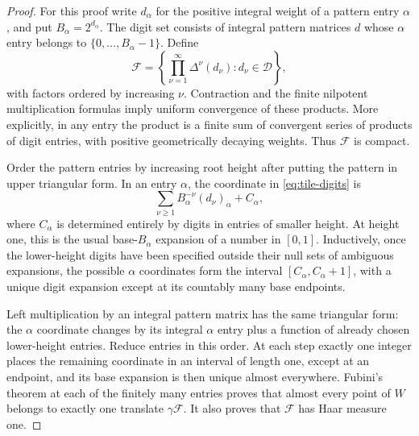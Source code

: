\begin{proof}
For this proof write \(d_\alpha\) for the positive integral weight
of a pattern entry \(\alpha\), and put \(B_\alpha=2^{d_\alpha}\).
The digit set consists of integral pattern matrices \(d\) whose
\(\alpha\) entry belongs to \(\{0,\ldots,B_\alpha-1\}\).
Define
\begin{equation}\label{eq:tile-digits}
 \mathcal F=
 \left\{
      \prod_{\nu=1}^{\infty}\Delta^\nu(d_\nu):
                      d_\nu\in\mathcal D
 \right\},
\end{equation}
with factors ordered by increasing \(\nu\).
Contraction and the finite nilpotent multiplication formulas imply
uniform convergence of these products.  More explicitly, in any
entry the product is a finite sum of convergent series of products
of digit entries, with positive geometrically decaying weights.
Thus \(\mathcal F\) is compact.

Order the pattern entries by increasing root height after putting
the pattern in upper triangular form.  In an entry \(\alpha\), the
coordinate in \eqref{eq:tile-digits} is
\[
       \sum_{\nu\ge1}B_\alpha^{-\nu}(d_\nu)_\alpha
                  +C_\alpha,
\]
where \(C_\alpha\) is determined entirely by digits in entries of
smaller height.  At height one, this is the usual base-\(B_\alpha\)
expansion of a number in \([0,1]\).  Inductively, once the
lower-height digits have been specified outside their null sets
of ambiguous expansions, the possible \(\alpha\) coordinates
form the interval \([C_\alpha,C_\alpha+1]\), with a unique digit
expansion except at its countably many base endpoints.

Left multiplication by an integral pattern matrix has the same
triangular form: the \(\alpha\) coordinate changes by its integral
\(\alpha\) entry plus a function of already chosen lower-height
entries.  Reduce entries in this order.  At each step exactly one
integer places the remaining coordinate in an interval of length
one, except at an endpoint, and its base expansion is then unique
almost everywhere.  Fubini's theorem at each of the finitely many
entries proves that almost every point of \(W\) belongs to exactly
one translate \(\gamma\mathcal F\).  It also proves that
\(\mathcal F\) has Haar measure one.


\end{proof}
